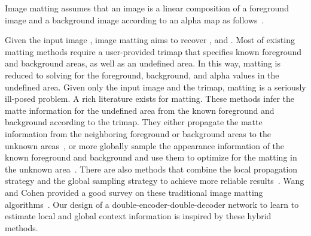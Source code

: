 \documentclass[10pt,twocolumn,letterpaper]{article}
\begin{document}
Image matting assumes that an image  is a linear composition of a foreground image  and a background image  according to an alpha map  as follows~\cite{smith1996blue}.

Given the input image , image matting aims to recover ,  and . Most of existing matting methods require a user-provided trimap that specifies known foreground and background areas, as well as an undefined area. In this way, matting is reduced to solving for the foreground, background, and alpha values in the undefined area. Given only the input image  and the trimap, matting is a seriously ill-posed problem. A rich literature exists for matting. These methods infer the matte information for the undefined area from the known foreground and background according to the trimap. They either propagate the matte information from the neighboring foreground or background areas to the unknown areas~\cite{aksoy2017designing, chen2013knn, chen2013image, he2010fast, lee2011nonlocal, levin2008closed, levin2008spectral,  sun2004poisson}, or more globally sample the appearance information of the known foreground and background and use them to optimize for the matting in the unknown area~\cite{chuang2001bayesian, he2013iterative, he2011global, wang2005iterative, wang2007optimized}. There are also methods that combine the local propagation strategy and the global sampling strategy to achieve more reliable results~\cite{aksoy2017designing, chen2013knn, chen2013image, he2010fast, he2011global}. Wang and Cohen provided a good survey on these traditional image matting algorithms~\cite{wang2008image}. Our design of a double-encoder-double-decoder network to learn to estimate local and global context information is inspired by these hybrid methods.
\end{document}
